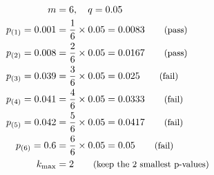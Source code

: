 \begin{align*}
m &= 6, \quad q = 0.05 \\
p_{(1)} = 0.001 &= \frac{1}{6} \times 0.05 = 0.0083 \qquad \text{\small (pass)} \\
p_{(2)} = 0.008 &= \frac{2}{6} \times 0.05 = 0.0167 \qquad \text{\small (pass)} \\
p_{(3)} = 0.039 &= \frac{3}{6} \times 0.05 = 0.025 \qquad \text{\small (fail)} \\
p_{(4)} = 0.041 &= \frac{4}{6} \times 0.05 = 0.0333 \qquad \text{\small (fail)} \\
p_{(5)} = 0.042 &= \frac{5}{6} \times 0.05 = 0.0417 \qquad \text{\small (fail)} \\
p_{(6)} = 0.6 &= \frac{6}{6} \times 0.05 = 0.05 \qquad \text{\small (fail)} \\
k_{\max} &= 2 \qquad \text{\small (keep the 2 smallest p-values)}
\end{align*}
